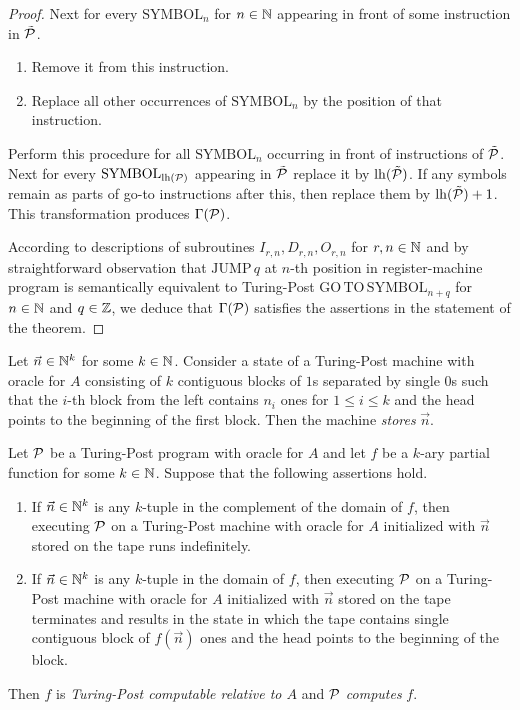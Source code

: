 \documentclass[10pt]{amsart}
\begin{document}
\begin{proof}
	Next for every  $\mathrm{SYMBOL}_n$ for $n\in {\mathbb N}$ appearing in front of some instruction in $\tilde{{\mathcal P}}$.
	\begin{enumerate}[label=\textbf{(\arabic*)}, leftmargin=3.0em]
		\item Remove it from this instruction.
		\item Replace all other occurrences of $\mathrm{SYMBOL}_n$ by the position of that instruction.
	\end{enumerate}
	Perform this procedure for all $\mathrm{SYMBOL}_n$ occurring in front of instructions of $\tilde{{\mathcal P}}$. Next for every $\mathrm{SYMBOL}_{\mathrm{lh}({\mathcal P})}$ appearing in $\tilde{{\mathcal P}}$ replace it by $\mathrm{lh}(\tilde{{\mathcal P}})$. If any symbols remain as parts of go-to instructions after this, then replace them by $\mathrm{lh}(\tilde{{\mathcal P}}) + 1$. This transformation produces $\Gamma({\mathcal P})$.

	According to descriptions of subroutines $I_{r,n}, D_{r,n}, O_{r,n}$ for $r,n\in {\mathbb N}$ and by straightforward observation that $\mathrm{JUMP\,}q$ at $n$-th position in register-machine program is semantically equivalent to Turing-Post $\mathrm{GO\,TO\,}\mathrm{SYMBOL}_{n + q}$ for $n\in {\mathbb N}$ and $q\in {\mathbb Z}$, we deduce that $\Gamma({\mathcal P})$ satisfies the assertions in the statement of the theorem.
\end{proof}

\begin{definition}
	Let $\vec{n}\in {\mathbb N}^k$ for some $k \in {\mathbb N}$. Consider a state of a Turing-Post machine with oracle for $A$ consisting of $k$ contiguous blocks of $1$s separated by single $0$s such that the $i$-th block from the left contains $n_i$ ones for $1\leq i \leq k$ and the head points to the beginning of the first block. Then the machine \textit{stores} $\vec{n}$.
\end{definition}

\begin{definition}
	Let ${\mathcal P}$ be a Turing-Post program with oracle for $A$ and let $f$ be a $k$-ary partial function for some $k \in {\mathbb N}$. Suppose that the following assertions hold.
	\begin{enumerate}[label=\textbf{(\arabic*)}, leftmargin=3.0em]
		\item If $\vec{n}\in {\mathbb N}^k$ is any $k$-tuple in the complement of the domain of $f$, then executing ${\mathcal P}$ on a Turing-Post machine with oracle for $A$ initialized with $\vec{n}$ stored on the tape runs indefinitely.
		\item If $\vec{n} \in {\mathbb N}^k$ is any $k$-tuple in the domain of $f$, then executing ${\mathcal P}$ on a Turing-Post machine with oracle for $A$ initialized with $\vec{n}$ stored on the tape terminates and results in the state in which the tape contains single contiguous block of $f(\vec{n})$ ones and the head points to the beginning of the block.
	\end{enumerate}
	Then $f$ is \textit{Turing-Post computable relative to $A$} and ${\mathcal P}$ \textit{computes} $f$.
\end{definition}
\end{document}
